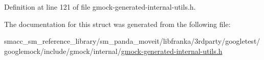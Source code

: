 Definition at line 121 of file gmock-\/generated-\/internal-\/utils.\+h.



The documentation for this struct was generated from the following file\+:\begin{DoxyCompactItemize}
\item 
smacc\+\_\+sm\+\_\+reference\+\_\+library/sm\+\_\+panda\+\_\+moveit/libfranka/3rdparty/googletest/googlemock/include/gmock/internal/\hyperlink{gmock-generated-internal-utils_8h}{gmock-\/generated-\/internal-\/utils.\+h}\end{DoxyCompactItemize}
